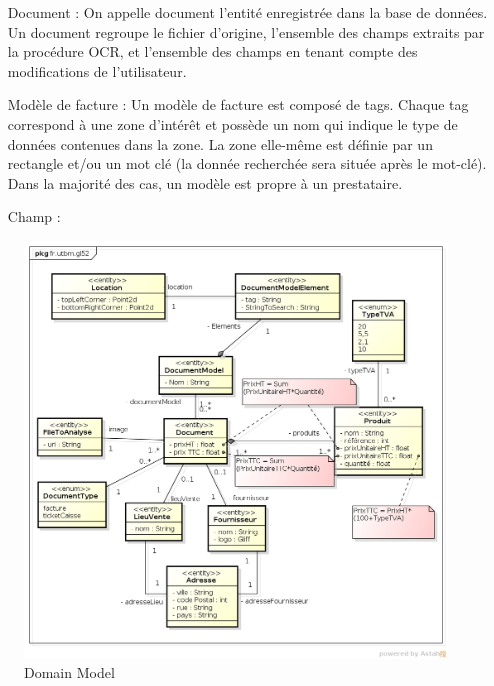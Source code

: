 \begin{enumerate}[label=\bfseries]
	\item[{Document :}] On appelle document l'entité enregistrée dans la base de données. Un document regroupe le fichier d'origine, l'ensemble des champs extraits par la procédure OCR, et l'ensemble des champs en tenant compte des modifications de l'utilisateur.
	\item[{Modèle de facture :}] Un modèle de facture est composé de tags. Chaque tag correspond à une zone d'intérêt et possède un nom qui indique le type de données contenues dans la zone. La zone elle-même est définie par un rectangle et/ou un mot clé (la donnée recherchée sera située après le mot-clé). Dans la majorité des cas, un modèle est propre à un prestataire.
	\item[{Champ :}] 
\end{enumerate}

\begin{figure}
	\begin{center}
		\includegraphics[scale = 0.4]{img/domainModel.png}
	\end{center}
	\caption{Domain Model}
	\label{domainModel}
\end{figure}
